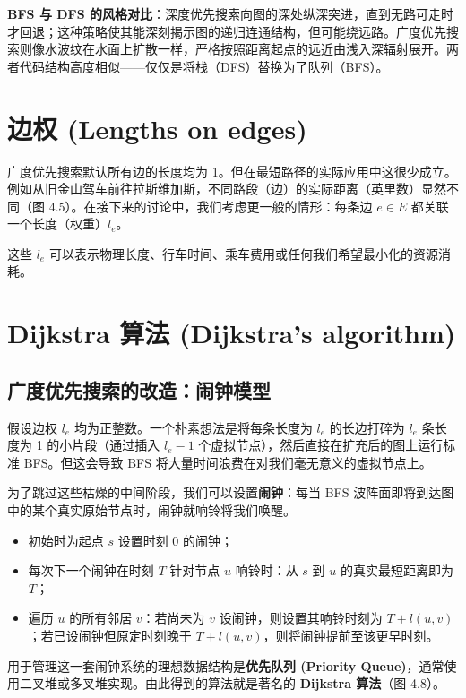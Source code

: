 \textbf{BFS 与 DFS 的风格对比}：深度优先搜索向图的深处纵深突进，直到无路可走时才回退；这种策略使其能深刻揭示图的递归连通结构，但可能绕远路。广度优先搜索则像水波纹在水面上扩散一样，严格按照距离起点的远近由浅入深辐射展开。两者代码结构高度相似——仅仅是将栈（DFS）替换为了队列（BFS）。

\section{边权 (Lengths on edges)}

广度优先搜索默认所有边的长度均为 1。但在最短路径的实际应用中这很少成立。例如从旧金山驾车前往拉斯维加斯，不同路段（边）的实际距离（英里数）显然不同（图 4.5）。在接下来的讨论中，我们考虑更一般的情形：每条边 $e \in E$ 都关联一个长度（权重）$l_e$。

这些 $l_e$ 可以表示物理长度、行车时间、乘车费用或任何我们希望最小化的资源消耗。

\section{Dijkstra 算法 (Dijkstra's algorithm)}

\subsection{广度优先搜索的改造：闹钟模型}
假设边权 $l_e$ 均为正整数。一个朴素想法是将每条长度为 $l_e$ 的长边打碎为 $l_e$ 条长度为 1 的小片段（通过插入 $l_e - 1$ 个虚拟节点），然后直接在扩充后的图上运行标准 BFS。但这会导致 BFS 将大量时间浪费在对我们毫无意义的虚拟节点上。

为了跳过这些枯燥的中间阶段，我们可以设置\textbf{闹钟}：每当 BFS 波阵面即将到达图中的某个真实原始节点时，闹钟就响铃将我们唤醒。
\begin{itemize}
    \item 初始时为起点 $s$ 设置时刻 0 的闹钟；
    \item 每次下一个闹钟在时刻 $T$ 针对节点 $u$ 响铃时：从 $s$ 到 $u$ 的真实最短距离即为 $T$；
    \item 遍历 $u$ 的所有邻居 $v$：若尚未为 $v$ 设闹钟，则设置其响铃时刻为 $T + l(u, v)$；若已设闹钟但原定时刻晚于 $T + l(u, v)$，则将闹钟提前至该更早时刻。
\end{itemize}

用于管理这一套闹钟系统的理想数据结构是\textbf{优先队列 (Priority Queue)}，通常使用二叉堆或多叉堆实现。由此得到的算法就是著名的 \textbf{Dijkstra 算法}（图 4.8）。


